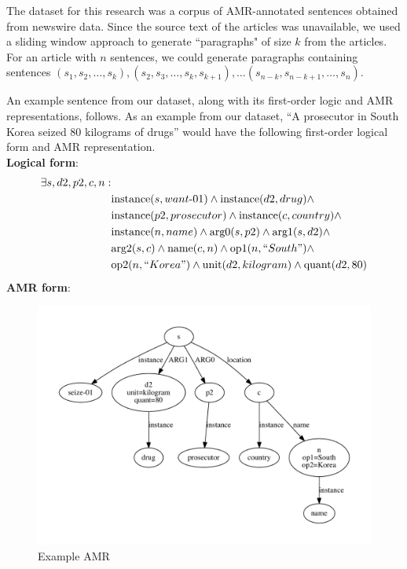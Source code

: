 \documentclass[12pt]{article}
\begin{document}
The dataset for this research was a corpus of AMR-annotated sentences obtained
from newswire data. Since the source text of the articles was unavailable, we
used a sliding window approach to generate ``paragraphs" of size $k$ from the
articles. For an article with $n$ sentences, we could generate paragraphs
containing sentences $(s_1,s_2,\ldots,s_k), (s_2,s_3,\ldots,s_k,s_{k+1}),
\ldots (s_{n-k},s_{n-k+1},\ldots,s_n)$.

An example sentence from our dataset, along with its first-order logic and AMR
representations, follows.
As an example from our dataset, ``A prosecutor in South Korea seized 80
kilograms of drugs'' would have the following first-order logical form and AMR
representation.\\

\noindent \textbf{Logical form}:
\begin{equation}
\begin{split}
\exists s,d2,p2,c,n: &\\
&\text{instance}(s,want\text{-}01) \wedge \text{instance}(d2, drug) \wedge \\
&\text{instance}(p2, prosecutor) \wedge \text{instance}(c, country) \wedge \\
&\text{instance}(n, name) \wedge \text{arg0}(s,p2) \wedge \text{arg1}(s,d2)
\wedge \\ &\text{arg2}(s,c) \wedge \text{name}(c,n) \wedge \text{op1}(n,
``South") \wedge \\ &\text{op2}(n, ``Korea") \wedge \text{unit}(d2, kilogram)
\wedge \text{quant}(d2, 80)
\end{split}
\end{equation}
\textbf{AMR form}:
\begin{figure}
\includegraphics[width=\linewidth]{amr_example.pdf}
\caption{Example AMR}
\end{figure}
\end{document}
